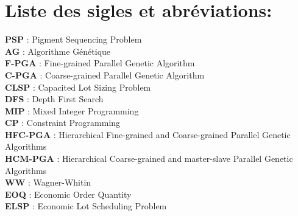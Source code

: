 \documentclass[12pt,a4paper]{article}
\begin{document}
	\newpage
	\tableofcontents
	
	\newpage
	
	\listoffigures
	
	\newpage
	
	\listoftables
	
	\newpage
	
	\listofalgorithms
	
	\newpage
	\section*{Liste des sigles et abréviations:}
	
	\vspace{1cm}
	
	\textbf{PSP} : Pigment Sequencing Problem \\
	\hspace*{.5cm} \textbf{AG} : Algorithme Génétique \\
	\hspace*{.5cm} \textbf{F-PGA} : Fine-grained Parallel Genetic Algorithm \\
	\hspace*{.5cm} \textbf{C-PGA} : Coarse-grained Parallel Genetic Algorithm \\
	\hspace*{.5cm} \textbf{CLSP} : Capacited Lot Sizing Problem \\
	\hspace*{.5cm} \textbf{DFS} : Depth First Search\\
	\hspace*{.5cm} \textbf{MIP} : Mixed Integer Programming \\
	\hspace*{.5cm} \textbf{CP} : Constraint Programming \\
	\hspace*{.5cm} \textbf{HFC-PGA} : Hierarchical Fine-grained and Coarse-grained Parallel Genetic Algorithms \\
\hspace*{.5cm} \textbf{HCM-PGA} : Hierarchical Coarse-grained and master-slave Parallel Genetic Algorithms \\
	\hspace*{.5cm} \textbf{WW} : Wagner-Whitin \\
	\hspace*{.5cm} \textbf{EOQ} : Economic Order Quantity \\
	\hspace*{.5cm} \textbf{ELSP} : Economic Lot Scheduling Problem
	
\end{document}
